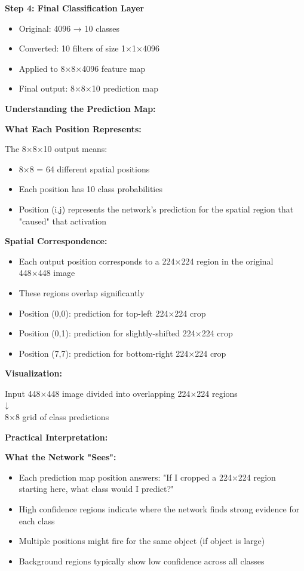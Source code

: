 \documentclass[12pt]{article}
\newcommand{\explanation}[1]{{\color{explanationcolor}#1}}
\begin{document}
\begin{enumerate}[(a)]
{{    \textbf{Step 4: Final Classification Layer}
    \begin{itemize}
        \item Original: 4096 → 10 classes
        \item Converted: 10 filters of size 1×1×4096
        \item Applied to 8×8×4096 feature map
        \item Final output: 8×8×10 prediction map
    \end{itemize}
    }
    
    \textbf{Understanding the Prediction Map:}
    
    \explanation{
    \textbf{What Each Position Represents:}
    
    The 8×8×10 output means:
    \begin{itemize}
        \item 8×8 = 64 different spatial positions
        \item Each position has 10 class probabilities
        \item Position (i,j) represents the network's prediction for the spatial region that "caused" that activation
    \end{itemize}
    
    \textbf{Spatial Correspondence:}
    \begin{itemize}
        \item Each output position corresponds to a 224×224 region in the original 448×448 image
        \item These regions overlap significantly
        \item Position (0,0): prediction for top-left 224×224 crop
        \item Position (0,1): prediction for slightly-shifted 224×224 crop
        \item Position (7,7): prediction for bottom-right 224×224 crop
    \end{itemize}
    
    \textbf{Visualization:}
    \begin{center}
    Input 448×448 image divided into overlapping 224×224 regions\\
    ↓\\
    8×8 grid of class predictions
    \end{center}
    }
    
    \textbf{Practical Interpretation:}
    
    \explanation{
    \textbf{What the Network "Sees":}
    \begin{itemize}
        \item Each prediction map position answers: "If I cropped a 224×224 region starting here, what class would I predict?"
        \item High confidence regions indicate where the network finds strong evidence for each class
        \item Multiple positions might fire for the same object (if object is large)
        \item Background regions typically show low confidence across all classes
    \end{itemize}
    
}}
\end{enumerate}
\end{document}
